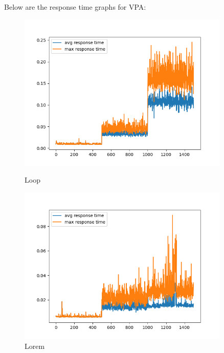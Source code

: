 \noindent Below are the response time graphs for VPA:

\begin{figure}[h]
    \begin{minipage}[t]{0.5\textwidth}
        \centering
        \includegraphics[width=0.9\textwidth]{../sample_results/loop/vpa/response-time-vpa-vpa.png}
        \caption{Loop}
    \end{minipage}
    \hfill
    \begin{minipage}[t]{0.5\textwidth}
        \centering
        \includegraphics[width=0.9\textwidth]{../sample_results/lorem/vpa/response-time-vpa-vpa.png}
        \caption{Lorem}
    \end{minipage}
\end{figure}

\newpage
